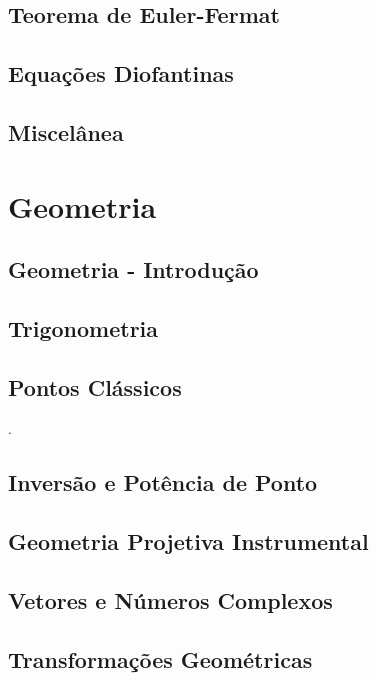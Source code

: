 \subsection{Teorema de Euler-Fermat}

\subsection{Equações Diofantinas}

\subsection{Miscelânea}


\pagebreak

\section{Geometria}
\subsection{Geometria - Introdução}

\subsection{Trigonometria}

\subsection{Pontos Clássicos}.

\subsection{Inversão e Potência de Ponto}

\subsection{Geometria Projetiva Instrumental}

\subsection{Vetores e Números Complexos}

\subsection{Transformações Geométricas}

